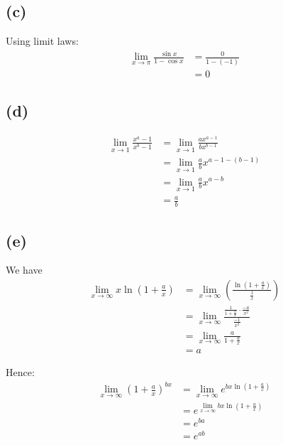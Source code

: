 \documentclass[11pt]{article}
\begin{document}
\subsection{(c)}
\label{sec:org3926503}

Using limit laws:
\begin{align*}
\lim_{x \rightarrow \pi} \frac{\sin x}{1 - \cos x} &= \frac{0}{1 - (- 1)} \\
&= 0
\end{align*}

\subsection{(d)}
\label{sec:org9fbacc9}

\begin{align*}
\lim_{x \rightarrow 1} \frac{x^a - 1}{x^b - 1} &= \lim_{x \rightarrow 1} \frac{ax^{a - 1}}{bx^{b - 1}} \\
&= \lim_{x \rightarrow 1} \frac{a}{b} x^{a - 1 - (b - 1)} \\
&= \lim_{x \rightarrow 1} \frac{a}{b} x^{a - b} \\
&= \frac{a}{b}
\end{align*}

\subsection{(e)}
\label{sec:orgde2b67b}

We have
\begin{align*}
\lim_{x \rightarrow \infty} x \ln \left(1 + \frac{a}{x} \right) &= \lim_{x \rightarrow \infty} \left( \frac{\ln (1 + \frac{a}{x})}{\frac{1}{x}} \right) \\
&= \lim_{x \rightarrow \infty} \frac{\frac{1}{1 + \frac{a}{x}} \cdot \frac{-a}{x^2}}{\frac{-1}{x^2}} \\
&= \lim_{x \rightarrow \infty} \frac{a}{1 + \frac{a}{x}} \\
&= a
\end{align*}

Hence:
\begin{align*}
\lim_{x \rightarrow \infty} \left( 1 + \frac{a}{x} \right)^{bx} &= \lim_{x \rightarrow \infty} e^{bx \ln(1 + \frac{a}{x})} \\
&= e^{\lim_{x \rightarrow \infty} b x \ln \left( 1 + \frac{a}{x} \right)} \\
&= e^{ba} \\
&= e^{ab}
\end{align*}
\end{document}
